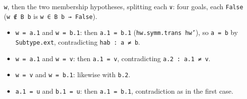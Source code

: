 \documentclass[11pt,a4paper]{article}
\newcommand{\lean}[1]{\texttt{\textcolor{leanink}{#1}}}
\begin{document}
\lean{w}, then the two membership hypotheses, splitting each \lean{∨}: four goals, each \lean{False}
(\lean{w ∉ B b} is \lean{w ∈ B b → False}).
\begin{itemize}
\item \lean{w = a.1} and \lean{w = b.1}: then \lean{a.1 = b.1} (\lean{hw.symm.trans hw'}), so
  \lean{a = b} by \lean{Subtype.ext}, contradicting \lean{hab : a ≠ b}.
\item \lean{w = a.1} and \lean{w = v}: then \lean{a.1 = v}, contradicting \lean{a.2 : a.1 ≠ v}.
\item \lean{w = v} and \lean{w = b.1}: likewise with \lean{b.2}.
\item \lean{a.1 = u} and \lean{b.1 = u}: then \lean{a.1 = b.1}, contradiction as in the first case.
\end{itemize}
\end{document}
